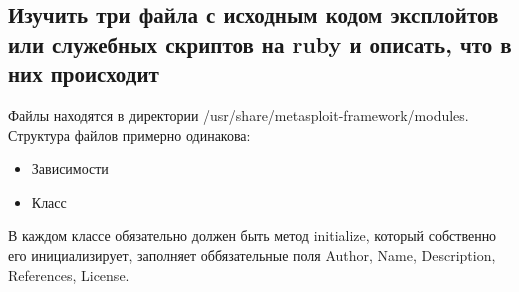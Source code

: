 \documentclass[a4paper, 14pt]{article}				%
\begin{document}
\subsection{Изучить три файла с исходным кодом эксплойтов или служебных скриптов на ruby и описать, что в них происходит}
Файлы находятся в директории /usr/share/metasploit-framework/modules.
Структура файлов примерно одинакова:\\
\begin{itemize}
\item{Зависимости}
\item{Класс}
\end{itemize}
В каждом классе обязательно должен быть метод initialize, который собственно его инициализирует, заполняет оббязательные поля Author, Name, Description, References, License.
\end{document}
